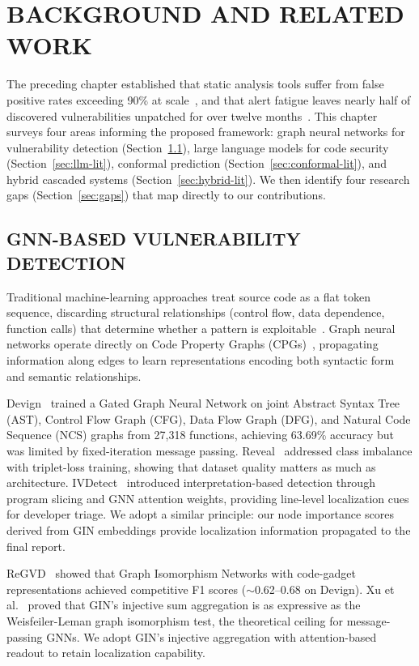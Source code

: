 \chapter{\uppercase{Background and Related Work}}

The preceding chapter established that static analysis tools suffer from
false positive rates exceeding 90\% at scale~\cite{ghostsecurity2025},
and that alert fatigue leaves nearly half of discovered vulnerabilities
unpatched for over twelve months~\cite{edgescan2025}. This chapter surveys
four areas informing the proposed framework: graph neural networks for
vulnerability detection (Section~\ref{sec:gnn-lit}), large language models for
code security (Section~\ref{sec:llm-lit}), conformal prediction
(Section~\ref{sec:conformal-lit}), and hybrid cascaded systems
(Section~\ref{sec:hybrid-lit}). We then identify four research gaps
(Section~\ref{sec:gaps}) that map directly to our contributions.

\section{\uppercase{GNN-Based Vulnerability Detection}}
\label{sec:gnn-lit}

Traditional machine-learning approaches treat source code as a flat
token sequence, discarding structural relationships (control flow, data
dependence, function calls) that determine whether a pattern is
exploitable~\cite{thapa2022}. Graph neural networks operate directly on
Code Property Graphs (CPGs)~\cite{cpg2014}, propagating information
along edges to learn representations encoding both syntactic form and
semantic relationships.

Devign~\cite{devign2019} trained a Gated Graph Neural Network on joint
Abstract Syntax Tree (AST), Control Flow Graph (CFG), Data Flow Graph (DFG), and Natural Code Sequence (NCS) graphs from 27,318 functions, achieving 63.69\%
accuracy but was limited by fixed-iteration message passing.
Reveal~\cite{reveal2021} addressed class imbalance with triplet-loss
training, showing that dataset quality matters as much as architecture.
IVDetect~\cite{ivdetect2021} introduced interpretation-based detection
through program slicing and GNN attention weights, providing line-level
localization cues for developer triage. We adopt a similar principle: our
node importance scores derived from GIN embeddings provide localization information
propagated to the final report.

ReGVD~\cite{regvd2022} showed that Graph Isomorphism Networks with
code-gadget representations achieved competitive F1 scores
($\sim$0.62--0.68 on Devign). Xu et al.~\cite{xu2019gin} proved that
GIN's injective sum aggregation is as expressive as the
Weisfeiler-Leman graph isomorphism test, the theoretical ceiling for
message-passing GNNs. We adopt GIN's injective aggregation with
attention-based readout to retain localization capability.


